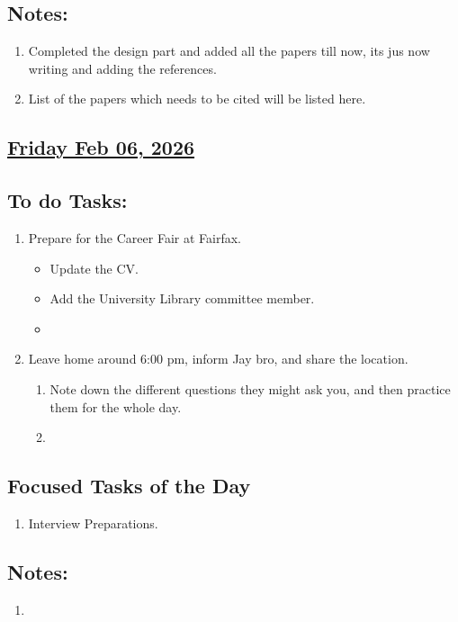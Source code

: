 \subsection*{Notes:}
\begin{enumerate}
    \item Completed the design part and added all the papers till now, its jus now writing and adding the references. 
    \item List of the papers which needs to be cited will be listed here.
\end{enumerate}
\subsection*{\underline{Friday Feb 06, 2026}}
\subsection*{To do Tasks:}
\begin{enumerate}
    \item Prepare for the Career Fair at Fairfax.
    \begin{itemize}
        \item Update the CV. 
        \item Add the University Library committee member.
        \item 
    \end{itemize}
    \item Leave home around 6:00 pm, inform Jay bro, and share the location.
    \begin{enumerate}
        \item Note down the different questions they might ask you, and then practice them for the whole day.
        \item 
    \end{enumerate}
\end{enumerate}
\subsection*{Focused Tasks of the Day}
\begin{enumerate}[\ding{52}]  %
    \item Interview Preparations.
\end{enumerate}
\subsection*{Notes:}
\begin{enumerate}
    \item 
\end{enumerate}
